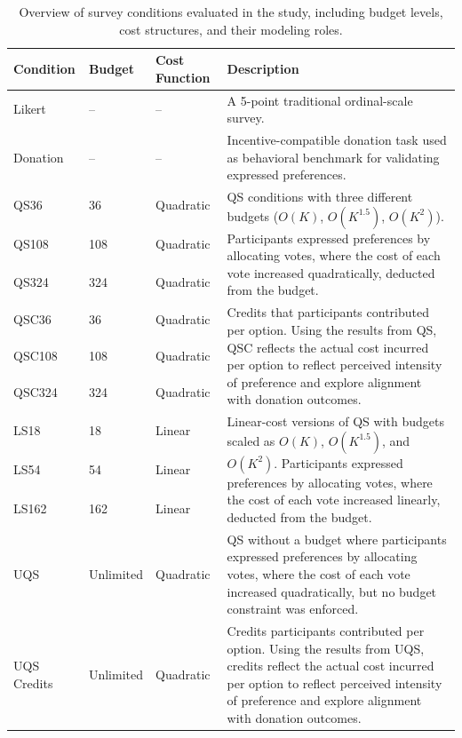 \begin{table}[h]
    \centering
    \begin{tabular}{@{}lllp{9cm}@{}}
        \toprule
        \textbf{Condition} & \textbf{Budget} & \textbf{Cost Function} & \textbf{Description} \\
        \midrule
        Likert & – & – & A 5-point traditional ordinal-scale survey. \\ 
        \midrule
        Donation & – & – & Incentive-compatible donation task used as behavioral benchmark for validating expressed preferences. \\
        \midrule
        QS36   & 36   & Quadratic & \multirow{3}{9cm}{QS conditions with three different budgets ($O(K)$, $O(K^{1.5})$, $O(K^2)$). Participants expressed preferences by allocating votes, where the cost of each vote increased quadratically, deducted from the budget.} \\
        QS108  & 108  & Quadratic & \\
        QS324  & 324  & Quadratic & \\
        \midrule
        QSC36  & 36   & Quadratic & \multirow{3}{9cm}{Credits that participants contributed per option. Using the results from QS, QSC reflects the actual cost incurred per option to reflect perceived intensity of preference and explore alignment with donation outcomes.} \\
        QSC108 & 108  & Quadratic & \\
        QSC324 & 324  & Quadratic & \\
        \midrule
        LS18   & 18   & Linear    & \multirow{3}{9cm}{Linear-cost versions of QS with budgets scaled as $O(K)$, $O(K^{1.5})$, and $O(K^2)$. Participants expressed preferences by allocating votes, where the cost of each vote increased linearly, deducted from the budget.} \\
        LS54   & 54   & Linear    & \\
        LS162  & 162  & Linear    & \\
        \midrule
        UQS    & Unlimited & Quadratic & QS without a budget where participants expressed preferences by allocating votes, where the cost of each vote increased quadratically, but no budget constraint was enforced. \\
        \midrule
        UQS Credits & Unlimited & Quadratic & Credits participants contributed per option. Using the results from UQS, credits reflect the actual cost incurred per option to reflect perceived intensity of preference and explore alignment with donation outcomes. \\
        \bottomrule
    \end{tabular}
    \caption{Overview of survey conditions evaluated in the study, including budget levels, cost structures, and their modeling roles.}
    \label{tbl:experiment_cond}
\end{table}


